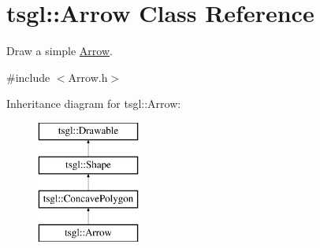 \hypertarget{classtsgl_1_1_arrow}{}\section{tsgl\+:\+:Arrow Class Reference}
\label{classtsgl_1_1_arrow}


Draw a simple \hyperlink{classtsgl_1_1_arrow}{Arrow}.  




{\ttfamily \#include $<$Arrow.\+h$>$}

Inheritance diagram for tsgl\+:\+:Arrow\+:\begin{figure}[H]
\begin{center}
\leavevmode
\includegraphics[height=4.000000cm]{classtsgl_1_1_arrow}
\end{center}
\end{figure}
